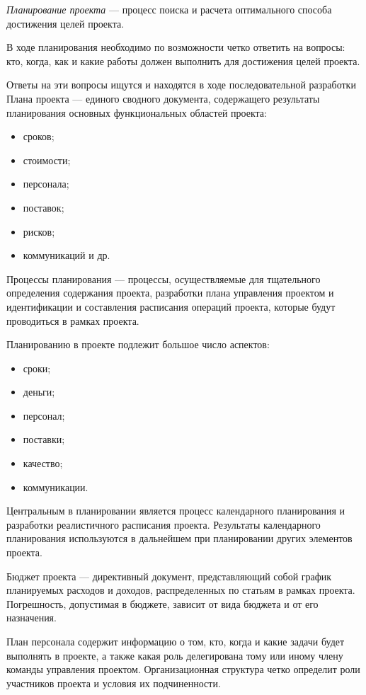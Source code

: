 \textit{Планирование проекта} --- процесс поиска и расчета оптимального способа достижения целей проекта.

В ходе планирования необходимо по воз­можности четко ответить на вопросы: кто, когда, как и какие работы должен выпол­нить для достижения целей проекта.

Ответы на эти вопросы ищутся и находятся в ходе последовательной разработки Плана проекта --- единого сводного документа, со­держащего результаты планирования основ­ных функциональных областей проекта:
\begin{itemize}
	\item сроков;
\item стоимости;
\item персонала;
\item поставок;
\item рисков;
\item коммуникаций и др.
\end{itemize}

Процессы планирования --- процессы, осуществляемые для тщательного определения содержания проекта, разработки плана управления проектом и идентификации и составления расписания операций проекта, которые будут проводиться в рамках проекта.

Планированию в проекте подлежит большое число аспектов:
\begin{itemize}
\item сроки;
\item деньги;
\item персонал;
\item поставки;
\item качество;
\item коммуникации.
\end{itemize}

Центральным в планировании является процесс календарного плани­рования и разработки реалистичного расписания проекта.
Результаты календарного планирования используются в дальнейшем при плани­ровании других элементов проекта.

Бюджет проекта --- директивный документ, представляющий собой график планируемых расходов и доходов, распределенных по статьям в рамках проекта.
Погрешность, допустимая в бюджете, зависит от вида бюджета и от его назначения.

План персонала содержит информацию о том, кто, когда и какие за­дачи будет выполнять в проекте, а также какая роль делегирована тому или иному члену команды управления проектом. 
Организацион­ная структура четко определит роли участников проекта и условия их подчиненности.

